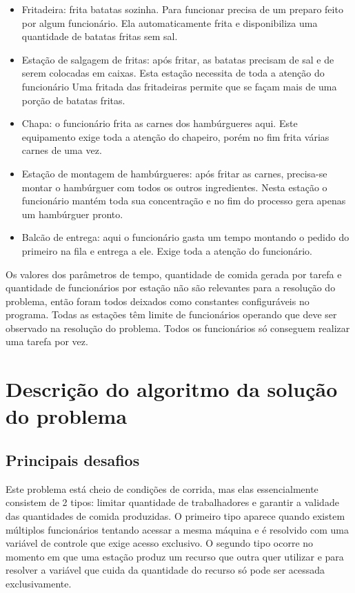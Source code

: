 \documentclass[a4paper]{article}
\begin{document}
\begin{itemize}
	\item Fritadeira: frita batatas sozinha. Para funcionar precisa de um preparo feito por algum funcionário. Ela automaticamente frita e disponibiliza uma quantidade de batatas fritas sem sal.

	\item Estação de salgagem de fritas: após fritar, as batatas precisam de sal e de serem colocadas em caixas. Esta estação necessita de toda a atenção do funcionário Uma fritada das fritadeiras permite que se façam mais de uma porção de batatas fritas.

	\item Chapa: o funcionário frita as carnes dos hambúrgueres aqui. Este equipamento exige toda a atenção do chapeiro, porém no fim frita várias carnes de uma vez.

	\item Estação de montagem de hambúrgueres: após fritar as carnes, precisa-se montar o hambúrguer com todos os outros ingredientes. Nesta estação o funcionário mantém toda sua concentração e no fim do processo gera apenas um hambúrguer pronto.

	\item Balcão de entrega: aqui o funcionário gasta um tempo montando o pedido do primeiro na fila e entrega a ele. Exige toda a atenção do funcionário.
\end{itemize}


Os valores dos parâmetros de tempo, quantidade de comida gerada por tarefa e quantidade de funcionários por estação não são relevantes para a resolução do problema, então foram todos deixados como constantes configuráveis no programa. Todas as estações têm limite de funcionários operando que deve ser observado na resolução do problema. Todos os funcionários só conseguem realizar uma tarefa por vez.

\section{Descrição do algoritmo da solução do problema}
\label{sec:algorithmDescription}

\subsection{Principais desafios}
\label{sec:biggestChallenges}

Este problema está cheio de condições de corrida, mas elas essencialmente consistem de 2 tipos: limitar quantidade de trabalhadores e garantir a validade das quantidades de comida produzidas. O primeiro tipo aparece quando existem múltiplos funcionários tentando acessar a mesma máquina e é resolvido com uma variável de controle que exige acesso exclusivo. O segundo tipo ocorre no momento em que uma estação produz um recurso que outra quer utilizar e para resolver a variável que cuida da quantidade do recurso só pode ser acessada exclusivamente.
\end{document}
